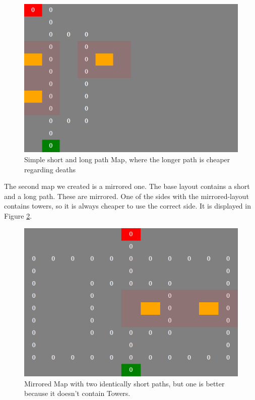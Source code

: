 \begin{figure}[H]
  \centering
  \includegraphics[width=1\linewidth]{images/map_shortlong}
  \caption{Simple short and long path Map, where the longer path is cheaper regarding deaths}
  \label{fig:mapshortlong}
\end{figure}


The second map we created is a mirrored one. The base layout contains a short and a long path. These are mirrored. One of the sides with the mirrored-layout contains towers, so it is always cheaper to use the correct side. It is displayed in Figure \ref{fig:mapsmirror}.

\begin{figure}[H]
  \centering
  \includegraphics[width=1\linewidth]{images/map_mirror}
  \caption{Mirrored Map with two identically short paths, but one is better because it doesn't contain Towers.}
  \label{fig:mapsmirror}
\end{figure}



